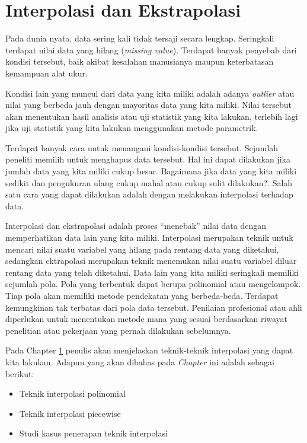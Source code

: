 \documentclass[]{book}
\providecommand{\tightlist}{%
  \setlength{\itemsep}{0pt}\setlength{\parskip}{0pt}}
\theoremstyle{definition}
\theoremstyle{definition}
\theoremstyle{definition}
\theoremstyle{remark}
\begin{document}
\hypertarget{interpolation}{%
\chapter{Interpolasi dan Ekstrapolasi}\label{interpolation}}

Pada dunia nyata, data sering kali tidak tersaji secara lengkap. Seringkali terdapat nilai data yang hilang (\emph{missing value}). Terdapat banyak penyebab dari kondisi tersebut, baik akibat kesalahan manusianya maupun keterbatasan kemampuan alat ukur.

Kondisi lain yang muncul dari data yang kita miliki adalah adanya \emph{outlier} atau nilai yang berbeda jauh dengan mayoritas data yang kita miliki. Nilai tersebut akan menentukan hasil analisis atau uji statistik yang kita lakukan, terlebih lagi jika uji statistik yang kita lakukan menggunakan metode parametrik.

Terdapat banyak cara untuk menangani kondisi-kondisi tersebut. Sejumlah peneliti memilih untuk menghapus data tersebut. Hal ini dapat dilakukan jika jumlah data yang kita miliki cukup besar. Bagaimana jika data yang kita miliki sedikit dan pengukuran ulang cukup mahal atau cukup sulit dilakukan?. Salah satu cara yang dapat dilakukan adalah dengan melakukan interpolasi terhadap data.

Interpolasi dan ekstrapolasi adalah proses ``menebak'' nilai data dengan memperhatikan data lain yang kita miliki. Interpolasi merupakan teknik untuk mencari nilai suatu variabel yang hilang pada rentang data yang diketahui, sedangkan ektrapolasi merupakan teknik menemukan nilai suatu variabel diluar rentang data yang telah diketahui. Data lain yang kita miliki seringkali memiliki sejumlah pola. Pola yang terbentuk dapat berupa polinomial atau mengelompok. Tiap pola akan memiliki metode pendekatan yang berbeda-beda. Terdapat kemungkinan tak terbatas dari pola data tersebut. Penilaian profesional atau ahli diperlukan untuk menentukan metode mana yang sesuai berdasarkan riwayat penelitian atau pekerjaan yang pernah dilakukan sebelumnya.

Pada Chapter \ref{interpolation} penulis akan menjelaskan teknik-teknik interpolasi yang dapat kita lakukan. Adapun yang akan dibahas pada \emph{Chapter} ini adalah sebagai berikut:

\begin{itemize}
\tightlist
\item
  Teknik interpolasi polinomial
\item
  Teknik interpolasi piecewise
\item
  Studi kasus penerapan teknik interpolasi
\end{itemize}
\end{document}
